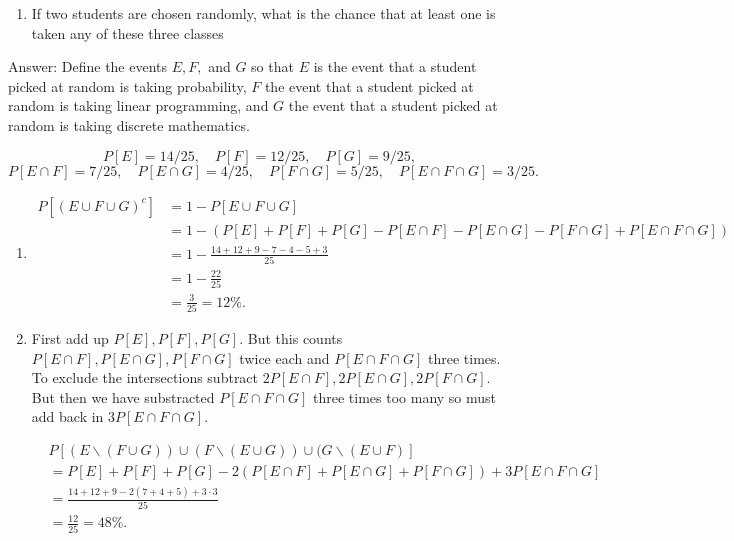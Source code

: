 \documentclass{article}
\begin{document}
\begin{enumerate}
\begin{enumerate}
\item If two students are chosen randomly, what is the chance that at least one is taken any of these three classes
\end{enumerate}

Answer: Define the events $E,F,$ and $G$ so that $E$ is the event that a student picked at random is taking probability, $F$ the event that a student picked at random is taking linear programming, and $G$ the event that a student picked at random is taking discrete mathematics.

$$
P[E] = 14/25, \quad P[F] = 12/25, \quad P[G] = 9/25,
$$
$$
P[E \cap F] = 7/25, \quad P[E\cap G] = 4/25, \quad P[F\cap G] = 5/25, \quad P[E\cap F \cap G] = 3/25.
$$ 

\begin{enumerate}
\item

\begin{align*}
P[(E\cup F \cup G)^c] &= 1 - P[E\cup F \cup G] \\
&= 1 - (P[E] + P[F] + P[G] - P[E \cap F] - P[E \cap G] - P[F \cap G] + P[E \cap F \cap G]) \\
&= 1 - \frac{14 + 12 + 9 - 7 - 4 - 5 + 3}{25} \\
&= 1 - \frac{22}{25} \\
&= \frac{3}{25} = 12\%.
\end{align*}

\item First add up $P[E], P[F], P[G]$. But this counts $P[E\cap F], P[E \cap G], P[F \cap G]$ twice each and $P[E \cap F \cap G]$ three times. To exclude the intersections subtract $2P[E\cap F], 2P[E \cap G], 2P[F \cap G]$. But then we have substracted $P[E\cap F \cap G]$ three times too many so must add back in $3P[E\cap F \cap G]$. 

\begin{align*}
&P[(E \backslash (F \cup G)) \cup (F \backslash (E \cup G)) \cup (G \backslash (E \cup F)]\\
&= P[E] + P[F] + P[G] - 2(P[E \cap F] + P[E\cap G] + P[F \cap G]) + 3P[E \cap F \cap G] \\
&= \frac{14 + 12 + 9 - 2(7 + 4 + 5) + 3\cdot 3}{25} \\
&= \frac{12}{25} = 48\%.
\end{align*}

\end{enumerate}


\end{enumerate}
\end{document}
